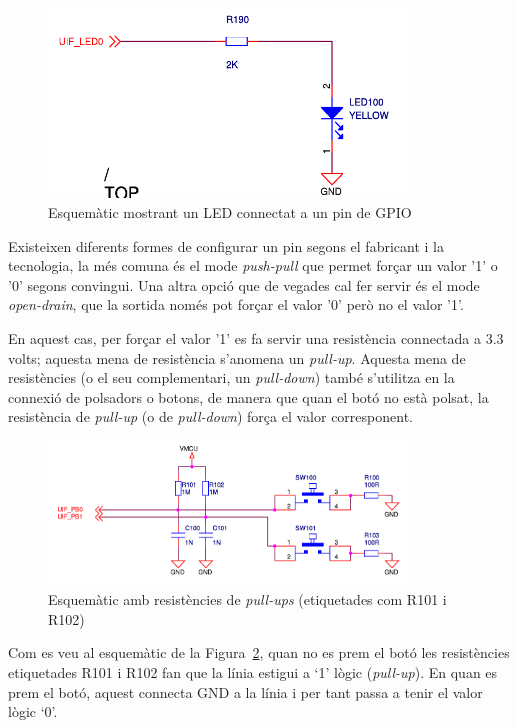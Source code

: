 \begin{figure}
 \centering
 \includegraphics[width=0.85\textwidth, keepaspectratio]{imatges/led.png}
 \caption{Esquemàtic mostrant un LED connectat a un pin de GPIO}
 \label{fig:led}
\end{figure}

Existeixen diferents formes de configurar un pin segons el fabricant i la tecnologia, la més comuna és el mode {\em push-pull} que permet forçar un valor '1' o '0' segons convingui. Una altra opció que de vegades cal fer servir és el mode {\em open-drain}, que la sortida només pot forçar el valor '0' però no el valor '1'.

En aquest cas, per forçar el valor '1' es fa servir una resistència connectada a 3.3 volts; aquesta mena de resistència s'anomena un {\em \gls{pull-up}}. Aquesta mena de resistències (o el seu complementari, un {\em \gls{pull-down}}) també s'utilitza en la connexió de polsadors o botons, de manera que quan el botó no està polsat, la resistència de {\em pull-up} (o de {\em pull-down}) força el valor corresponent.

\begin{figure}
 \centering
 \includegraphics[width=0.85\textwidth, keepaspectratio]{imatges/buttons.png}
 \caption[Esquemàtic amb resistències de {\em pull-ups}]{Esquemàtic amb resistències de {\em pull-ups} (etiquetades com R101 i R102)}
 \label{fig:pullup}
\end{figure}

Com es veu al esquemàtic de la Figura~\ref{fig:pullup}, quan no es prem el botó les resistències etiquetades R101 i R102 fan que la línia estigui a ‘1' lògic ({\em pull-up}). En quan es prem el botó, aquest connecta GND a la línia i per tant passa a tenir el valor lògic ‘0'.


